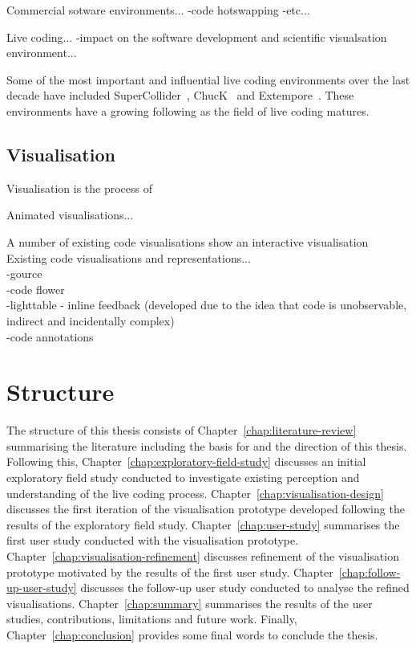 Commercial sotware environments...
-code hotswapping
-etc...

Live coding...
-impact on the software development and scientific visualsation environment...

Some of the most important and influential live coding environments over the last decade have included SuperCollider~\cite{McCartney}, ChucK~\cite{Wang2008} and Extempore~\cite{Sorensen}. These environments have a growing following as the field of live coding matures.

\subsection{Visualisation}

Visualisation is the process of 

Animated visualisations...

A number of existing code visualisations show an interactive visualisation Existing code visualisations and representations...\\
-gource~\cite{Caudwell2010}\\
-code flower\\
-lighttable - inline feedback (developed due to the idea that code is unobservable, indirect and incidentally complex) \\
-code annotations~\cite{Swift2013}

\section{Structure}

The structure of this thesis consists of Chapter~\ref{chap:literature-review} summarising the literature including the basis for and the direction of this thesis. Following this, Chapter~\ref{chap:exploratory-field-study} discusses an initial exploratory field study conducted to investigate existing perception and understanding of the live coding process. Chapter~\ref{chap:visualisation-design} discusses the first iteration of the visualisation prototype developed following the results of the exploratory field study. Chapter~\ref{chap:user-study} summarises the first user study conducted with the visualisation prototype. Chapter~\ref{chap:visualisation-refinement} discusses refinement of the visualisation prototype motivated by the results of the first user study. Chapter~\ref{chap:follow-up-user-study} discusses the follow-up user study conducted to analyse the refined visualisations. Chapter~\ref{chap:summary} summarises the results of the user studies, contributions, limitations and future work. Finally, Chapter~\ref{chap:conclusion} provides some final words to conclude the thesis.

